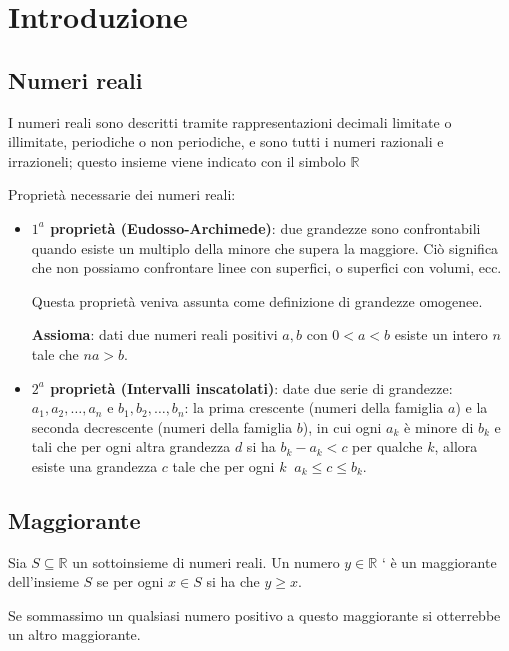 \documentclass[a4paper]{article}
\theoremstyle{break}
\theoremstyle{break}
\theoremstyle{break}
\theoremstyle{break}
\begin{document}


\tableofcontents
\pagebreak

\section{Introduzione}


\subsection{Numeri reali}
I numeri reali sono descritti tramite rappresentazioni decimali limitate o illimitate, periodiche
o non periodiche, e sono tutti i numeri razionali e irrazioneli; questo insieme viene indicato con
il simbolo \( \mathbb{R} \)

Proprietà necessarie dei numeri reali:
\begin{itemize}
	\item \textbf{\( 1^a \) proprietà (Eudosso-Archimede)}: due grandezze sono confrontabili quando esiste
	      un multiplo della minore che supera la maggiore. Ciò significa che non possiamo confrontare
	      linee con superfici, o superfici con volumi, ecc.

	      Questa proprietà veniva assunta come definizione di grandezze omogenee.

	      \textbf{Assioma}: dati due numeri reali positivi \( a, b \) con \( 0 < a < b \) esiste un
	      intero \( n \) tale che \( na > b \).
	\item \textbf{\( 2^a \) proprietà (Intervalli inscatolati)}: date due serie di grandezze:
	      \( a_1, a_2, \ldots, a_n \)
	      e \( b_1, b_2, \ldots, b_n \): la prima crescente (numeri della famiglia \( a \)) e la seconda
	      decrescente (numeri della famiglia \( b \)), in cui ogni \( a_k \) è minore di \( b_k \) e tali
	      che per ogni altra grandezza \( d \) si ha \( b_k - a_k < c \) per qualche \( k \), allora
	      esiste una grandezza \( c \) tale che per ogni \( k\;\; a_k \le c \le b_k \).
\end{itemize}


\subsection{Maggiorante}
\begin{definition}
	Sia \( S \subseteq \mathbb{R} \) un sottoinsieme di numeri reali. Un numero \( y \in \mathbb{R} \) `
	è un maggiorante dell'insieme \( S \) se per ogni \( x \in S \) si ha che \( y \ge x \).
\end{definition}
Se sommassimo un qualsiasi numero positivo a questo maggiorante si otterrebbe un altro maggiorante.
\end{document}
